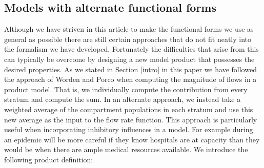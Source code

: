 \documentclass[pdflatex,sn-basic]{sn-jnl}%
\theoremstyle{definition}
\providecommand{\DIFadd}[1]{{\protect\color{blue}\uwave{#1}}} %
\providecommand{\DIFdel}[1]{{\protect\color{red}\sout{#1}}}                      %
\providecommand{\DIFaddbegin}{} %
\providecommand{\DIFaddend}{} %
\providecommand{\DIFdelbegin}{} %
\providecommand{\DIFdelend}{} %
\newcommand{\DIFscaledelfig}{0.5}
\newlength{\DIFdelgraphicswidth} %
\newlength{\DIFdelgraphicsheight} %
\newcommand{\DIFaddincludegraphics}[2][]{{\color{blue}\fbox{\DIFOincludegraphics[#1]{#2}}}} %
\newcommand{\DIFdelincludegraphics}[2][]{%
\sbox{\DIFdelgraphicsbox}{\DIFOincludegraphics[#1]{#2}}%
\settoboxwidth{\DIFdelgraphicswidth}{\DIFdelgraphicsbox} %
\settoboxtotalheight{\DIFdelgraphicsheight}{\DIFdelgraphicsbox} %
\scalebox{\DIFscaledelfig}{%
\parbox[b]{\DIFdelgraphicswidth}{\usebox{\DIFdelgraphicsbox}\\[-\baselineskip] \rule{\DIFdelgraphicswidth}{0em}}\llap{\resizebox{\DIFdelgraphicswidth}{\DIFdelgraphicsheight}{%
\setlength{\unitlength}{\DIFdelgraphicswidth}%
\begin{picture}(1,1)%
\thicklines\linethickness{2pt} %
{\color[rgb]{1,0,0}\put(0,0){\framebox(1,1){}}}%
{\color[rgb]{1,0,0}\put(0,0){\line( 1,1){1}}}%
{\color[rgb]{1,0,0}\put(0,1){\line(1,-1){1}}}%
\end{picture}%
}\hspace*{3pt}}} %
} %
\DeclareRobustCommand{\DIFaddbegin}{\DIFOaddbegin \let\includegraphics\DIFaddincludegraphics} %
\DeclareRobustCommand{\DIFaddend}{\DIFOaddend \let\includegraphics\DIFOincludegraphics} %
\DeclareRobustCommand{\DIFdelbegin}{\DIFOdelbegin \let\includegraphics\DIFdelincludegraphics} %
\DeclareRobustCommand{\DIFdelend}{\DIFOaddend \let\includegraphics\DIFOincludegraphics} %
\begin{document}
\subsection{Models with alternate functional forms}\label{aff}
Although we have \DIFdelbegin \DIFdel{striven }\DIFdelend \DIFaddbegin \DIFadd{tried }\DIFaddend in this article to make the functional forms we use as general as possible there are still certain approaches that do not fit neatly into the formalism we have developed. Fortunately the difficulties that arise from this can typically be overcome by designing a new model product that possesses the desired properties. As we stated in Section \ref{intro} in this paper we have followed the approach of Worden and Porco when computing the magnitude of flows in a product model. That is, we individually compute the contribution from every stratum and compute the sum. In an alternate approach, we instead take a weighted average of the compartment populations in each stratum and use this new average as the input to the flow rate function. This approach is particularly useful when incorporating inhibitory influences in a model. For example during an epidemic will be more careful if they know hospitals are at capacity than they would be when there are ample medical resources available. We introduce the following product definition:
\end{document}
